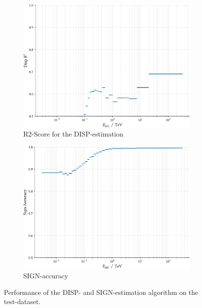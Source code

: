 \begin{figure}
    \begin{subfigure}{0.45\textwidth}
        \includegraphics[width=0.9\linewidth]{../analysis/plots/disp_test_mono_lst_r2_equal_filled.pdf} 
        \caption{R2-Score for the DISP-estimation}
    \end{subfigure}
    \begin{subfigure}{0.45\textwidth}
        \includegraphics[width=0.9\linewidth]{../analysis/plots/disp_test_mono_lst_acc_equal_filled.pdf}
        \caption{SIGN-accuracy}
    \end{subfigure}
    \caption{Performance of the DISP- and SIGN-estimation algorithm on the test-dataset.}
    \label{fig:disp_test_perf}
\end{figure}

